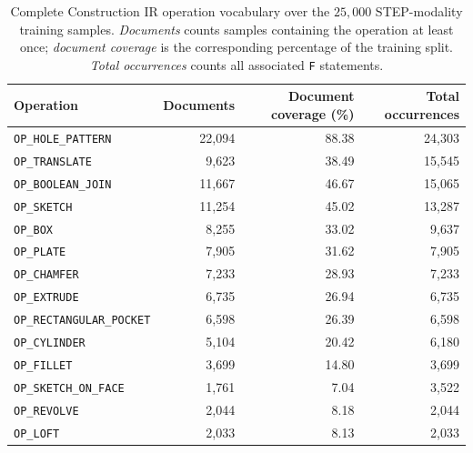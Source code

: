 \documentclass[preprint,12pt]{elsarticle}
\begin{document}
\begin{table}[htbp]
  \centering
  \scriptsize
  \caption{Complete Construction IR operation vocabulary over the $25{,}000$
    STEP-modality training samples. \emph{Documents} counts samples containing the
    operation at least once; \emph{document coverage} is the corresponding percentage of
    the training split. \emph{Total occurrences} counts all associated \texttt{F}
    statements.}
  \label{tab:ir_vocabulary}
  \begin{tabular}{lrrr}
    \toprule
    Operation                           & Documents & Document coverage (\%) & Total occurrences \\
    \midrule
    \texttt{OP\_HOLE\_PATTERN}          & 22{,}094  & 88.38                  & 24{,}303          \\
    \texttt{OP\_TRANSLATE}              & 9{,}623   & 38.49                  & 15{,}545          \\
    \texttt{OP\_BOOLEAN\_JOIN}          & 11{,}667  & 46.67                  & 15{,}065          \\
    \texttt{OP\_SKETCH}                 & 11{,}254  & 45.02                  & 13{,}287          \\
    \texttt{OP\_BOX}                    & 8{,}255   & 33.02                  & 9{,}637           \\
    \texttt{OP\_PLATE}                  & 7{,}905   & 31.62                  & 7{,}905           \\
    \texttt{OP\_CHAMFER}                & 7{,}233   & 28.93                  & 7{,}233           \\
    \texttt{OP\_EXTRUDE}                & 6{,}735   & 26.94                  & 6{,}735           \\
    \texttt{OP\_RECTANGULAR\_POCKET}    & 6{,}598   & 26.39                  & 6{,}598           \\
    \texttt{OP\_CYLINDER}               & 5{,}104   & 20.42                  & 6{,}180           \\
    \texttt{OP\_FILLET}                 & 3{,}699   & 14.80                  & 3{,}699           \\
    \texttt{OP\_SKETCH\_ON\_FACE}       & 1{,}761   & 7.04                   & 3{,}522           \\
    \texttt{OP\_REVOLVE}                & 2{,}044   & 8.18                   & 2{,}044           \\
    \texttt{OP\_LOFT}                   & 2{,}033   & 8.13                   & 2{,}033           \\

\end{tabular}
\end{table}
\end{document}
